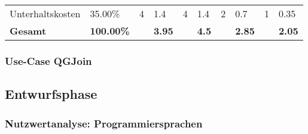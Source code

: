 \begin{table}[!htp]
\begin{tabular}{llllllllll}
		\rowcolor[HTML]{BBDAFF}
		Unterhaltskosten                          & 35.00\%                                 & 4                                                   & 1.4                                    & 4                                                   & 1.4                                    & 2                                                     & 0.7                                    & 1                                         & 0.35                                   \\
		\textbf{Gesamt}                           & \textbf{100.00\%}                       & \textbf{}                                           & \textbf{3.95}                          & \textbf{}                                           & \textbf{4.5}                           & \textbf{}                                             & \textbf{2.85}                          & \textbf{}                                 & \textbf{2.05}
	\end{tabular}
\end{table}

\subsubsection{Use-Case QGJoin}

\subsection{Entwurfsphase}
\subsubsection{Nutzwertanalyse: Programmiersprachen}

